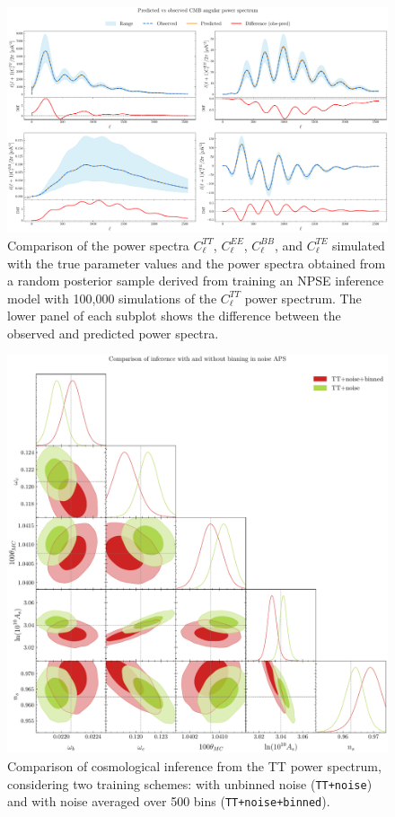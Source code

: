 \begin{figure}
    \centering
    \includegraphics[scale=0.225]{img/cmb_aps_pred_vs_obs_0.pdf}
    \caption{Comparison of the power spectra $C_{\ell}^{TT}$, $C_{\ell}^{EE}$, $C_{\ell}^{BB}$, and $C_{\ell}^{TE}$ simulated with the true parameter values and the power spectra obtained from a random posterior sample derived from training an NPSE inference model with 100,000 simulations of the $C_{\ell}^{TT}$ power spectrum. The lower panel of each subplot shows the difference between the observed and predicted power spectra.} 
    \label{fig:pred_vs_obs}
\end{figure}

\begin{figure}
    \centering
    \includegraphics[scale=0.35]{img/inference_with_noise.pdf}
    \caption{Comparison of cosmological inference from the TT power spectrum, considering two training schemes: with unbinned noise (\texttt{TT+noise}) 
    and with noise averaged over 500 bins (\texttt{TT+noise+binned}).}
    \label{fig:nsims_comparison}
\end{figure}